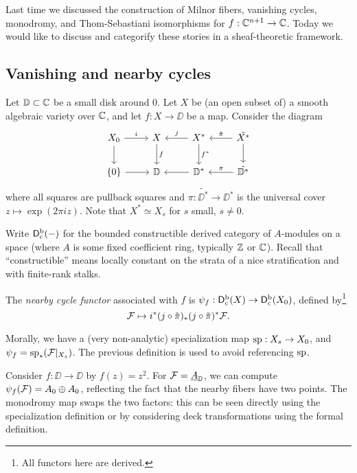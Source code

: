 \documentclass{article}
\begin{document}
Last time we discussed the construction of Milnor fibers, vanishing cycles, monodromy, and Thom-Sebastiani isomorphisms for $f: \mathbb{C}^{n+1} \to \mathbb{C}$.
Today we would like to discuss and categorify these stories in a sheaf-theoretic framework.

\subsection{Vanishing and nearby cycles}

Let $\mathbb{D} \subset \mathbb{C}$ be a small disk around $0$.
Let $X$ be (an open subset of) a smooth algebraic variety over $\mathbb{C}$, and let $f: X \to \DD$ be a map.
Consider the diagram 
\[
	\begin{tikzcd}
		X_0 \rar["i"] \dar & X \dar["f"] & \lar["j", swap] X^* \dar["f^*"] & \lar["\tilde{\pi}", swap] \tilde{X^*} \dar \\
		\{0\} \rar & \DD & \lar \DD^* & \lar["\pi", swap] \tilde{\DD^*}
	\end{tikzcd}
\]
where all squares are pullback squares and $\pi: \tilde{\DD^*} \to \DD^*$ is the universal cover $z \mapsto \exp(2\pi i z)$.
Note that $X^* \simeq X_s$ for $s$ small, $s \neq 0$.

Write $\mathsf{D}^\mathrm{b}_{\mathrm{c}}(-)$ for the bounded constructible derived category of $A$-modules on a space (where $A$ is some fixed coefficient ring, typically $\mathbb{Z}$ or $\mathbb{C}$).
Recall that ``constructible'' means locally constant on the strata of a nice stratification and with finite-rank stalks.

\begin{dfn}
	The \emph{nearby cycle functor} associated with $f$ is $\psi_f: \mathsf{D}^\mathrm{b}_{\mathrm{c}}(X) \to \mathsf{D}^\mathrm{b}_{\mathrm{c}}(X_0)$, defined by\footnote{All functors here are derived.}
	\[
		\mathcal{F} \mapsto i^* (j \circ \tilde{\pi})_* (j \circ \tilde{\pi})^* \mathcal{F}.
	\]
\end{dfn}

Morally, we have a (very non-analytic) specialization map $\operatorname{sp}: X_s \to X_0$, and $\psi_f = \operatorname{sp}_*(\mathcal{F}|_{X_s})$.
The previous definition is used to avoid referencing $\operatorname{sp}$.

\begin{ex}
	Consider $f: \DD \to \DD$ by $f(z) = z^2$.
	For $\mathcal{F} = \underline{A}_{\mathbb{D}}$, we can compute $\psi_f(\mathcal{F}) = A_0 \oplus A_0$, reflecting the fact that the nearby fibers have two points.
	The monodromy map swaps the two factors: this can be seen directly using the specialization definition or by considering deck transformations using the formal definition.
\end{ex}
\end{document}
